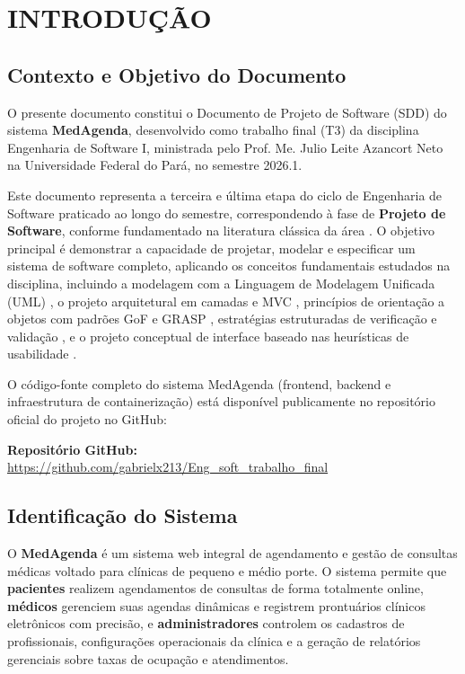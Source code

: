 \section{INTRODUÇÃO}

\subsection{Contexto e Objetivo do Documento}

O presente documento constitui o Documento de Projeto de Software (SDD) do sistema \textbf{MedAgenda}, desenvolvido como trabalho final (T3) da disciplina Engenharia de Software I, ministrada pelo Prof. Me. Julio Leite Azancort Neto na Universidade Federal do Pará, no semestre 2026.1.

Este documento representa a terceira e última etapa do ciclo de Engenharia de Software praticado ao longo do semestre, correspondendo à fase de \textbf{Projeto de Software}, conforme fundamentado na literatura clássica da área \cite{sommerville2011, pressman2016}. O objetivo principal é demonstrar a capacidade de projetar, modelar e especificar um sistema de software completo, aplicando os conceitos fundamentais estudados na disciplina, incluindo a modelagem com a Linguagem de Modelagem Unificada (UML) \cite{booch2005, larman2004}, o projeto arquitetural em camadas e MVC \cite{martin2019, fowler2002}, princípios de orientação a objetos com padrões GoF e GRASP \cite{gamma1995, meyer1997}, estratégias estruturadas de verificação e validação \cite{myers2011, beizer1995}, e o projeto conceptual de interface baseado nas heurísticas de usabilidade \cite{nielsen1993, norman2013}.

O código-fonte completo do sistema MedAgenda (frontend, backend e infraestrutura de containerização) está disponível publicamente no repositório oficial do projeto no GitHub:

\begin{center}
    \textbf{Repositório GitHub:} \url{https://github.com/gabrielx213/Eng_soft_trabalho_final}
\end{center}

\subsection{Identificação do Sistema}

O \textbf{MedAgenda} é um sistema web integral de agendamento e gestão de consultas médicas voltado para clínicas de pequeno e médio porte. O sistema permite que \textbf{pacientes} realizem agendamentos de consultas de forma totalmente online, \textbf{médicos} gerenciem suas agendas dinâmicas e registrem prontuários clínicos eletrônicos com precisão, e \textbf{administradores} controlem os cadastros de profissionais, configurações operacionais da clínica e a geração de relatórios gerenciais sobre taxas de ocupação e atendimentos.

